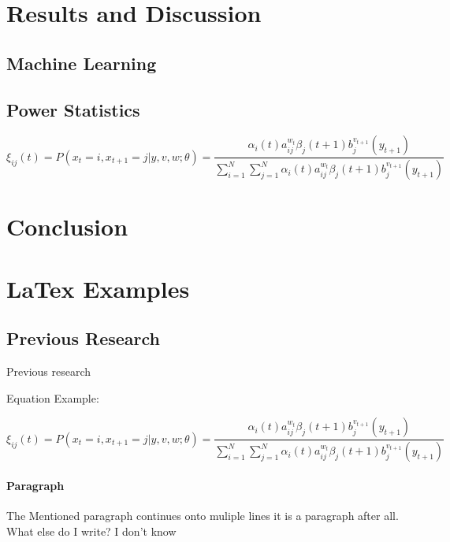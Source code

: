 \documentclass{article}
\begin{document}
\section{Results and Discussion}

\subsection{Machine Learning}
\subsection{Power Statistics}
\begin{equation}
\xi _{ij}(t)=P(x_{t}=i,x_{t+1}=j|y,v,w;\theta)= {\frac {\alpha _{i}(t)a^{w_t}_{ij}\beta _{j}(t+1)b^{v_{t+1}}_{j}(y_{t+1})}{\sum _{i=1}^{N} \sum _{j=1}^{N} \alpha _{i}(t)a^{w_t}_{ij}\beta _{j}(t+1)b^{v_{t+1}}_{j}(y_{t+1})}}
\end{equation}

\section{Conclusion}




\section{LaTex Examples}
\label{sec:headings}

\subsection{Previous Research}
Previous research \par
Equation Example: \newline

\begin{equation}
\xi _{ij}(t)=P(x_{t}=i,x_{t+1}=j|y,v,w;\theta)= {\frac {\alpha _{i}(t)a^{w_t}_{ij}\beta _{j}(t+1)b^{v_{t+1}}_{j}(y_{t+1})}{\sum _{i=1}^{N} \sum _{j=1}^{N} \alpha _{i}(t)a^{w_t}_{ij}\beta _{j}(t+1)b^{v_{t+1}}_{j}(y_{t+1})}}
\end{equation}


\paragraph{Paragraph}
The Mentioned paragraph continues onto muliple lines it is a paragraph after all. What else do I write? I don't know
\end{document}
